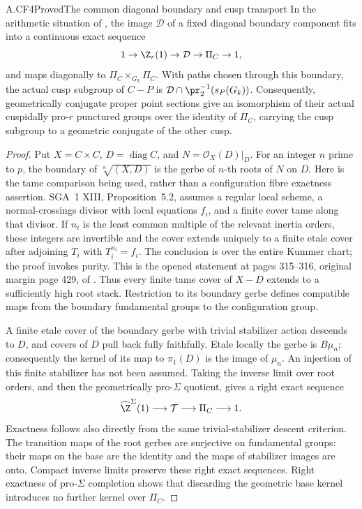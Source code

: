 \begin{claim}{A.CF4}{Proved}{The common diagonal boundary and cusp transport}
In the arithmetic situation of , the image
$\mathcal D$ of a fixed diagonal boundary component fits into a
continuous exact sequence
\[
 1\to\Z_r(1)\to\mathcal D\to\Pi_C\to1,
\]
and maps diagonally to $\Pi_C\times_{G_k}\Pi_C$. With paths chosen
through this boundary, the actual cusp subgroup of $C-P$ is
$\mathcal D\cap\pr_2^{-1}(s_P(G_k))$. Consequently, geometrically
conjugate proper point sections give an isomorphism of their actual
cuspidally pro-$r$ punctured groups over the identity of $\Pi_C$,
carrying the cusp subgroup to a geometric conjugate of the other cusp.
\end{claim}
\begin{proof}
Put $X=C\times C$, $D=\operatorname{diag} C$, and
$N=\mathcal O_X(D)|_D$. For an integer $n$ prime to $p$, the boundary
of $\sqrt[n]{(X,D)}$ is the gerbe of $n$-th roots of $N$ on $D$.
Here is the tame comparison being used, rather than a configuration
fibre exactness assertion. SGA~1 XIII, Proposition~5.2, assumes a
regular local scheme, a normal-crossings divisor with local equations
$f_i$, and a finite cover tame along that divisor. If $n_i$ is the
least common multiple of the relevant inertia orders, these integers
are invertible and the cover extends uniquely to a finite etale cover
after adjoining $T_i$ with $T_i^{n_i}=f_i$. The conclusion is over the
entire Kummer chart; the proof invokes purity. This is the opened
statement at pages 315--316, original margin page 429, of \cite{SGA1}.
Thus every finite tame cover of $X-D$ extends to a sufficiently high
root stack. Restriction to its boundary gerbe defines compatible maps
from the boundary fundamental groups to the configuration group.

A finite etale cover of the boundary gerbe with trivial stabilizer
action descends to $D$, and covers of $D$ pull back fully faithfully.
Etale locally the gerbe is $B\mu_n$; consequently the kernel of its
map to $\pi_1(D)$ is the image of $\mu_n$. An injection of this
finite stabilizer has not been assumed. Taking the inverse limit over
root orders, and then the geometrically pro-$\Sigma$ quotient, gives
a right exact sequence
\[
 \widehat\Z^{\Sigma}(1)\longrightarrow\mathcal T
                 \longrightarrow\Pi_C\longrightarrow1.
\]
Exactness follows also directly from the same trivial-stabilizer
descent criterion. The transition maps of the root gerbes are
surjective on fundamental groups: their maps on the base are the
identity and the maps of stabilizer images are onto. Compact inverse
limits preserve these right exact sequences. Right exactness of
pro-$\Sigma$ completion shows that discarding the geometric base
kernel introduces no further kernel over $\Pi_C$.


\end{proof}
